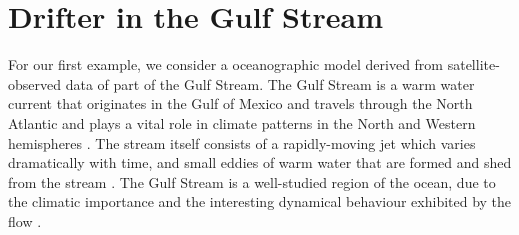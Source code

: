 \section{Drifter in the Gulf Stream}\label{sec:appl_ocean}
For our first example, we consider a oceanographic model derived from satellite-observed data of part of the Gulf Stream.
The Gulf Stream is a warm water current that originates in the Gulf of Mexico and travels through the North Atlantic and plays a vital role in climate patterns in the North and Western hemispheres \citep{Palter_2015_RoleGulfStream}.
The stream itself consists of a rapidly-moving jet which varies dramatically with time, and small eddies of warm water that are formed and shed from the stream \citep{KangCurchitser_2013_GulfStreamEddy}.
The Gulf Stream is a well-studied region of the ocean, due to the climatic importance and the interesting dynamical behaviour exhibited by the flow \citep{LiuEtAl_2018_GulfStreamTransport}.

